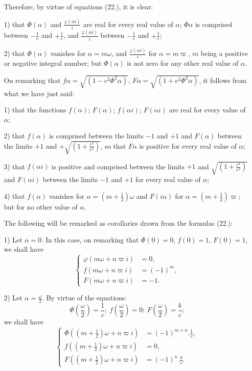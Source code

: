 \documentclass{article}
\begin{document}
Therefore, by virtue of equations (22.), it is clear:

1) that $\Phi(\alpha)$ and $\frac{\varphi(\alpha i)}{i}$ are real for every real value of $\alpha$; $\Phi\alpha$ is comprised between $-\frac{1}{c}$ and $+\frac{1}{c}$, and $\frac{\varphi(\alpha i)}{i}$ between $-\frac{1}{e}$ and $+\frac{1}{e}$;

2) that $\Phi(\alpha)$ vanishes for $\alpha=m\omega$, and $\frac{\varphi(\alpha i)}{i}$ for $\alpha=m\varpi$, $m$ being a positive or negative integral number; but $\Phi(\alpha)$ is not zero for any other real value of $\alpha$.

On remarking that $f\alpha=\sqrt{(1-c^{2}\Phi^{2}\alpha)}$, $F\alpha=\sqrt{(1+e^{2}\Phi^{2}\alpha)}$, it follows from what we have just said:

1) that the functions $f(\alpha)$; $F(\alpha)$; $f(\alpha i)$; $F(\alpha i)$ are real for every value of $\alpha$;

2) that $f(\alpha)$ is comprised between the limits $-1$ and $+1$ and $F(\alpha)$ between the limits $+1$ and $+\sqrt{\left(1+\frac{e^{2}}{c^{2}}\right)}$, so that $F\alpha$ is positive for every real value of $\alpha$;

3) that $f(\alpha i)$ is positive and comprised between the limits $+1$ and $\sqrt{\left(1+\frac{c^{2}}{e^{2}}\right)}$ and $F(\alpha i)$ between the limits $-1$ and $+1$ for every real value of $\alpha$;


4) that $f(\alpha)$ vanishes for $\alpha=(m+\frac{1}{2})\omega$ and $F(i\alpha)$ for $\alpha=(m+\frac{1}{2})\varpi$; but for no other value of $\alpha$.

The following will be remarked as corollaries drawn from the formulas (22.):

1) Let $\alpha=0$. In this case, on remarking that $\Phi(0)=0$, $f(0)=1$, $F(0)=1$, we shall have
\[ \left\{\begin{aligned} \varphi(m\omega+n\varpi i)&=0,\\ f(m\omega+n\varpi i)&=(-1)^{m},\\ F(m\omega+n\varpi i)&=-1. \end{aligned}\right. \tag{23.} \]

2) Let $\alpha=\frac{\omega}{2}$. By virtue of the equations:
\[ \Phi\left(\frac{\omega}{2}\right)=\frac{1}{c};\ f\left(\frac{\omega}{2}\right)=0;\ F\left(\frac{\omega}{2}\right)=\frac{b}{c}; \]
we shall have
\[ \left\{\begin{aligned} \Phi((m+\tfrac{1}{2})\omega+n\varpi i)&=(-1)^{m+n}.\frac{1}{c},\\ f((m+\tfrac{1}{2})\omega+n\varpi i)&=0,\\ F((m+\tfrac{1}{2})\omega+n\varpi i)&=(-1)^{n}.\frac{b}{c}. \end{aligned}\right. \tag{24.} \]
\end{document}
